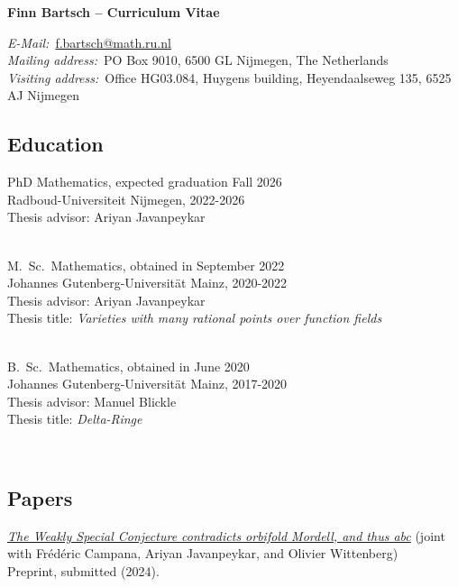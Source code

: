 \documentclass[paper=a4,fontsize=11pt,DIV=11,BCOR=3mm,pdftex]{scrartcl}
\begin{document}
\thispagestyle{empty}
{
\centering
\Large \textbf{Finn Bartsch -- Curriculum Vitae} \par
}
\bigskip \par
\textit{E-Mail:}~\href{mailto:f.bartsch@math.ru.nl}{f.bartsch@math.ru.nl} \\
\textit{Mailing address:}~PO Box 9010, 6500 GL Nijmegen, The Netherlands \\
\textit{Visiting address:}~Office HG03.084, Huygens building, Heyendaalseweg 135, 6525 AJ Nijmegen \\
\par

\subsection*{Education}
PhD Mathematics, expected graduation Fall 2026 \\
Radboud-Universiteit Nijmegen, 2022-2026 \\
Thesis advisor: Ariyan Javanpeykar \\
~\par

M.~Sc.~Mathematics, obtained in September 2022 \\
Johannes Gutenberg-Universität Mainz, 2020-2022 \\
Thesis advisor: Ariyan Javanpeykar \\
Thesis title: \textit{Varieties with many rational points over function fields} \\
~\par

B.~Sc.~Mathematics, obtained in June 2020 \\
Johannes Gutenberg-Universität Mainz, 2017-2020 \\
Thesis advisor: Manuel Blickle \\
Thesis title: \textit{Delta-Ringe}

~\par


\subsection*{Papers}


\href{https://arxiv.org/abs/2410.06643}{\textit{The Weakly Special Conjecture contradicts orbifold Mordell, and thus abc}} (joint with Frédéric Campana, Ariyan Javanpeykar, and Olivier Wittenberg) \\
Preprint, submitted (2024). \\
\end{document}
